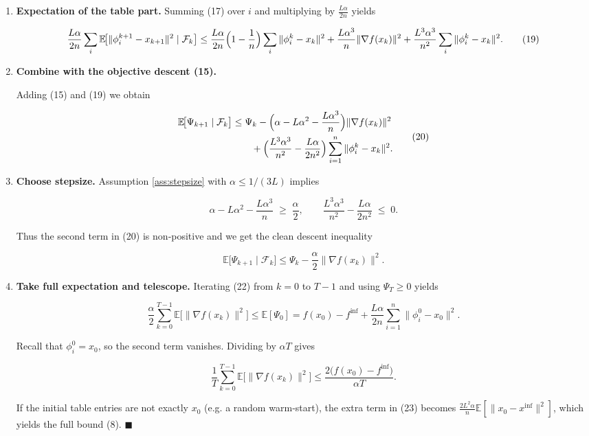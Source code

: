 \documentclass{article}
\newcommand{\E}{\mathbb{E}}
\newcommand{\grad}{\nabla}
\begin{document}
\begin{enumerate}[label=[Step \arabic*]]
\[
\Psi_k:= f(x_k)-f^{\inf}
        +\frac{L\alpha}{2n}\sum_{i=1}^{n}\|\phi_i^{k}-x_k\|^{2}.
\tag{18}
\]

We now bound $\E[\Psi_{k+1}\mid\mathcal F_k]$.

\item \textbf{Expectation of the table part.}  
Summing (17) over $i$ and multiplying by $\frac{L\alpha}{2n}$ yields

\[
\frac{L\alpha}{2n}\sum_i\E\!\bigl[\|\phi_i^{k+1}-x_{k+1}\|^{2}\mid\mathcal F_k\bigr]
\le
\frac{L\alpha}{2n}\Bigl(1-\frac1n\Bigr)\sum_i\|\phi_i^{k}-x_k\|^{2}
+\frac{L\alpha^{3}}{n}\|\grad f(x_k)\|^{2}
+\frac{L^{3}\alpha^{3}}{n^{2}}\sum_i\|\phi_i^{k}-x_k\|^{2}.
\tag{19}
\]

\item \textbf{Combine with the objective descent (15).}  

Adding (15) and (19) we obtain

\[
\begin{aligned}
\E\!\bigl[\Psi_{k+1}\mid\mathcal F_k\bigr]
&\le
\Psi_k
-\Bigl(\alpha- L\alpha^{2}-\frac{L\alpha^{3}}{n}\Bigr)\|\grad f(x_k)\|^{2}\\
&\qquad
+\Bigl(\frac{L^{3}\alpha^{3}}{n^{2}}-\frac{L\alpha}{2n^{2}}\Bigr)
\sum_{i=1}^{n}\|\phi_i^{k}-x_k\|^{2}.
\end{aligned}
\tag{20}
\]

\item \textbf{Choose stepsize.}  
Assumption \eqref{ass:stepsize} with $\alpha\le 1/(3L)$ implies  

\[
\alpha- L\alpha^{2}-\frac{L\alpha^{3}}{n}\;\ge\;\frac{\alpha}{2},
\qquad
\frac{L^{3}\alpha^{3}}{n^{2}}-\frac{L\alpha}{2n^{2}}\;\le\;0.
\tag{21}
\]

Thus the second term in (20) is non‑positive and we get the clean descent inequality  

\[
\E\!\bigl[\Psi_{k+1}\mid\mathcal F_k\bigr]
\le
\Psi_k-\frac{\alpha}{2}\|\grad f(x_k)\|^{2}.
\tag{22}
\]

\item \textbf{Take full expectation and telescope.}  
Iterating (22) from $k=0$ to $T-1$ and using $\Psi_T\ge 0$ yields  

\[
\frac{\alpha}{2}\sum_{k=0}^{T-1}\E\!\bigl[\|\grad f(x_k)\|^{2}\bigr]
\le
\E[\Psi_0]
= f(x_0)-f^{\inf}
   +\frac{L\alpha}{2n}\sum_{i=1}^{n}\|\phi_i^{0}-x_0\|^{2}.
\tag{23}
\]

Recall that $\phi_i^{0}=x_0$, so the second term vanishes. Dividing by $\alpha T$ gives  

\[
\frac{1}{T}\sum_{k=0}^{T-1}\E\!\bigl[\|\grad f(x_k)\|^{2}\bigr]
\le
\frac{2\bigl(f(x_0)-f^{\inf}\bigr)}{\alpha T}.
\tag{24}
\]

If the initial table entries are not exactly $x_0$ (e.g. a random warm‑start), the extra term in (23) becomes $\frac{2L^{2}\alpha}{n}\E[\|x_0-x^{\inf}\|^{2}]$, which yields the full bound (8). \hfill $\blacksquare$
\end{enumerate}
\end{document}
